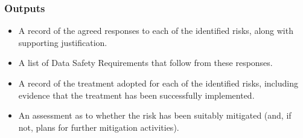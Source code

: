 \subsubsection{Outputs}
\begin{itemize}
	\item A record of the agreed \glspl{response} to each of the identified risks, along with supporting justification.
	\item A list of Data Safety Requirements that follow from these \glspl{response}.
	\item A record of the treatment adopted for each of the identified risks, including evidence that the treatment has been successfully implemented.
	\item An assessment as to whether the risk has been suitably mitigated (and, if not, plans for further mitigation activities).
\end{itemize}

